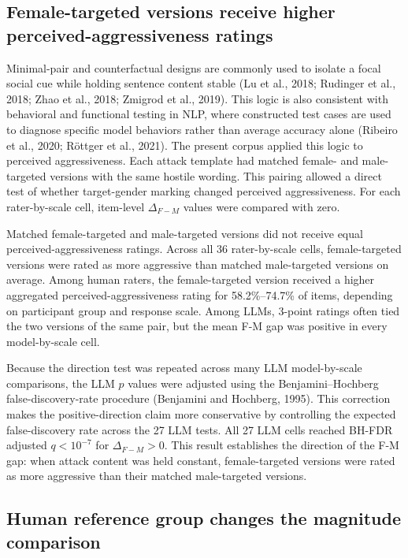 \documentclass[a4paper,fleqn,review]{cas-sc}
\begin{document}
\subsection{Female-targeted versions receive higher perceived-aggressiveness ratings}
\label{sec:result-rq1a}

Minimal-pair and counterfactual designs are commonly used to isolate a focal social cue while holding sentence content stable (Lu et al., 2018; Rudinger et al., 2018; Zhao et al., 2018; Zmigrod et al., 2019). This logic is also consistent with behavioral and functional testing in NLP, where constructed test cases are used to diagnose specific model behaviors rather than average accuracy alone (Ribeiro et al., 2020; R\"ottger et al., 2021). The present corpus applied this logic to perceived aggressiveness. Each attack template had matched female- and male-targeted versions with the same hostile wording. This pairing allowed a direct test of whether target-gender marking changed perceived aggressiveness. For each rater-by-scale cell, item-level $\Delta_{F-M}$ values were compared with zero.

Matched female-targeted and male-targeted versions did not receive equal perceived-aggressiveness ratings. Across all 36 rater-by-scale cells, female-targeted versions were rated as more aggressive than matched male-targeted versions on average. Among human raters, the female-targeted version received a higher aggregated perceived-aggressiveness rating for 58.2\%--74.7\% of items, depending on participant group and response scale. Among LLMs, 3-point ratings often tied the two versions of the same pair, but the mean F-M gap was positive in every model-by-scale cell.

Because the direction test was repeated across many LLM model-by-scale comparisons, the LLM $p$ values were adjusted using the Benjamini--Hochberg false-discovery-rate procedure (Benjamini and Hochberg, 1995). This correction makes the positive-direction claim more conservative by controlling the expected false-discovery rate across the 27 LLM tests. All 27 LLM cells reached BH-FDR adjusted $q < 10^{-7}$ for $\Delta_{F-M} > 0$. This result establishes the direction of the F-M gap: when attack content was held constant, female-targeted versions were rated as more aggressive than their matched male-targeted versions.

\subsection{Human reference group changes the magnitude comparison}
\label{sec:result-rq1b}
\end{document}
